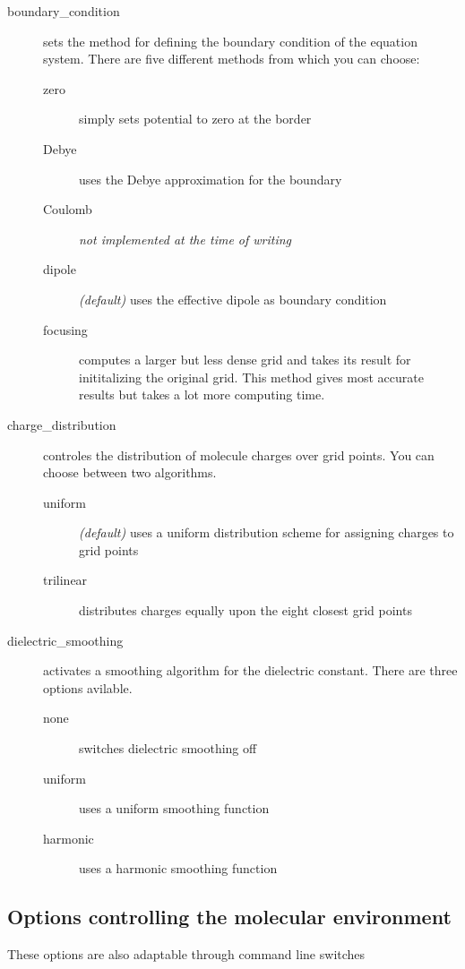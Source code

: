 \documentclass[12pt,twoside,a4paper]{article}
\begin{document}
\begin{description}
\item[boundary\_condition] sets the method for defining the boundary
	condition of the equation system. There are five different methods from
	which you can choose:
	\begin{description}
	\item[zero] simply sets potential to zero at the border
	\item[Debye] uses the Debye approximation for the boundary
	\item[Coulomb] \emph{not implemented at the time of writing}
	\item[dipole] \emph{(default)} uses the effective dipole as boundary
		condition
	\item[focusing] computes a larger but less dense grid and takes its
		result for inititalizing the original grid. This method gives most
		accurate results but takes a lot more computing time.
	\end{description}
\item[charge\_distribution] controles the distribution of molecule charges
	over grid points. You can choose between two algorithms.
	\begin{description}
	\item[uniform] \emph{(default)} uses a uniform distribution scheme for
		assigning charges to grid points
	\item[trilinear] distributes charges equally upon the eight closest grid
		points
	\end{description}
\item[dielectric\_smoothing] activates a smoothing algorithm for the
	dielectric constant. There are three options avilable.
	\begin{description}
	\item[none] switches dielectric smoothing off
	\item[uniform] uses a uniform smoothing function
	\item[harmonic] uses a harmonic smoothing function
	\end{description}
\end{description}

\subsection{Options controlling the molecular environment}

These options are also adaptable through command line switches
\end{document}

